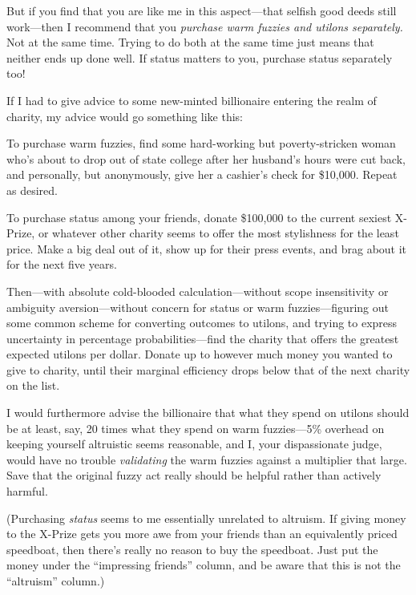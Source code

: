 {
 But if you find that you are like me in this aspect---that selfish
good deeds still work---then I recommend that you \textit{purchase warm
fuzzies and utilons separately.} Not at the same time. Trying to do
both at the same time just means that neither ends up done well. If
status matters to you, purchase status separately too!}

{
 If I had to give advice to some new-minted billionaire entering
the realm of charity, my advice would go something like this:}

{
 To purchase warm fuzzies, find some hard-working but
poverty-stricken woman who's about to drop out of state
college after her husband's hours were cut back, and
personally, but anonymously, give her a cashier's check
for \$10,000. Repeat as desired.}

{
 To purchase status among your friends, donate \$100,000 to the
current sexiest X-Prize, or whatever other charity seems to offer the
most stylishness for the least price. Make a big deal out of it, show
up for their press events, and brag about it for the next five years.}

{
 Then---with absolute cold-blooded calculation---without scope
insensitivity or ambiguity aversion{}---without concern for status or
warm fuzzies---figuring out some common scheme for converting outcomes
to utilons, and trying to express uncertainty in percentage
probabilities---find the charity that offers the greatest expected
utilons per dollar. Donate up to however much money you wanted to give
to charity, until their marginal efficiency drops below that of the
next charity on the list.}

{
 I would furthermore advise the billionaire that what they spend on
utilons should be at least, say, 20 times what they spend on warm
fuzzies---5\% overhead on keeping yourself altruistic seems reasonable,
and I, your dispassionate judge, would have no trouble
\textit{validating} the warm fuzzies against a multiplier that large.
Save that the original fuzzy act really should be helpful rather than
actively harmful.}

{
 (Purchasing \textit{status} seems to me essentially unrelated to
altruism. If giving money to the X-Prize gets you more awe from your
friends than an equivalently priced speedboat, then
there's really no reason to buy the speedboat. Just put
the money under the ``impressing
friends'' column, and be aware that this is not the
``altruism'' column.)}

